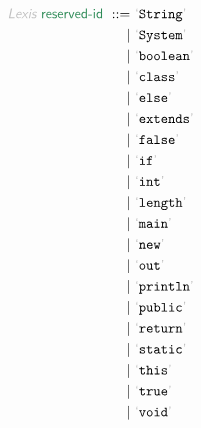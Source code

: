 \begin{align*}
  \KEY{Lexis} ~ 
     \SYN{reserved-id}
      ~ ::= ~ &
      \LEX{String} \\
      ~ \mid ~ &  \LEX{System} \\
      ~ \mid ~ &  \LEX{boolean} \\
      ~ \mid ~ &  \LEX{class} \\
      ~ \mid ~ &  \LEX{else} \\
      ~ \mid ~ &  \LEX{extends} \\
      ~ \mid ~ &  \LEX{false} \\
      ~ \mid ~ &  \LEX{if} \\
      ~ \mid ~ &  \LEX{int} \\
      ~ \mid ~ &  \LEX{length} \\
      ~ \mid ~ &  \LEX{main} \\
      ~ \mid ~ &  \LEX{new} \\
      ~ \mid ~ &  \LEX{out} \\
      ~ \mid ~ &  \LEX{println} \\
      ~ \mid ~ &  \LEX{public} \\
      ~ \mid ~ &  \LEX{return} \\
      ~ \mid ~ &  \LEX{static} \\
      ~ \mid ~ &  \LEX{this} \\
      ~ \mid ~ &  \LEX{true} \\
      ~ \mid ~ &  \LEX{void}
\end{align*}
